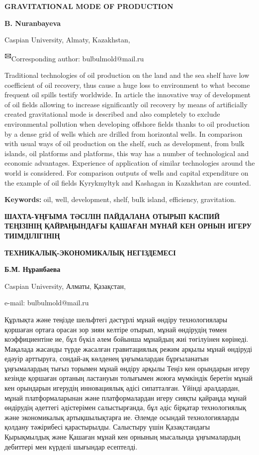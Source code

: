 {\bfseries GRAVITATIONAL MODE OF PRODUCTION}

{\bfseries B. Nuranbayeva}

Caspian University, Almaty, Kazakhstan,

{\bfseries \textsuperscript{🖂}}Corresponding author: bulbulmold@mail.ru

Traditional technologies of oil production on the land and the sea shelf
have low coefficient of oil recovery, thus cause a huge loss to
environment to what become frequent oil spills testify worldwide. In
article the innovative way of development of oil fields allowing to
increase significantly oil recovery by means of artificially created
gravitational mode is described and also completely to exclude
environmental pollution when developing offshore fields thanks to oil
production by a dense grid of wells which are drilled from horizontal
wells. In comparison with usual ways of oil production on the shelf,
such as development, from bulk islands, oil platforms and platforms,
this way has a number of technological and economic advantages.
Experience of application of similar technologies around the world is
considered. For comparison outputs of wells and capital expenditure on
the example of oil fields Kyrykmyltyk and Kashagan in Kazakhstan are
counted.

{\bfseries Keywords:} oil, well, development, shelf, bulk island,
efficiency, gravitation.

{\bfseries ШАХТА-ҰҢҒЫМА ТӘСІЛІН ПАЙДАЛАНА ОТЫРЫП КАСПИЙ ТЕҢІЗІНІҢ
ҚАЙРАҢЫНДАҒЫ ҚАШАҒАН МҰНАЙ КЕН ОРНЫН ИГЕРУ ТИІМДІЛІГІНІҢ}

{\bfseries ТЕХНИКАЛЫҚ-ЭКОНОМИКАЛЫҚ НЕГІЗДЕМЕСІ}

{\bfseries Б.М. Нұранбаева}

Caspian University, Алматы, Қазақстан,

e-mail: bulbulmold@mail.ru

Құрлықта және теңізде шельфтегі дәстүрлі мұнай өндіру технологиялары
қоршаған ортаға орасан зор зиян келтіре отырып, мұнай өндірудің төмен
коэффициентіне ие, бұл бүкіл әлем бойынша мұнайдың жиі төгілуінен
көрінеді. Мақалада жасанды түрде жасалған гравитациялық режим арқылы
мұнай өндіруді едәуір арттыруға, сондай-ақ көлденең ұңғымалардан
бұрғыланатын ұңғымалардың тығыз торымен мұнай өндіру арқылы Теңіз кен
орындарын игеру кезінде қоршаған ортаның ластануын толығымен жоюға
мүмкіндік беретін мұнай кен орындарын игерудің инновациялық әдісі
сипатталған. Үйінді аралдардан, мұнай платформаларынан және
платформалардан игеру сияқты қайраңда мұнай өндірудің әдеттегі
әдістерімен салыстырғанда, бұл әдіс бірқатар технологиялық және
экономикалық артықшылықтарға ие. Әлемде осындай технологияларды қолдану
тәжірибесі қарастырылды. Салыстыру үшін Қазақстандағы Қырықмылдық және
Қашаған мұнай кен орнының мысалында ұңғымалардың дебиттері мен күрделі
шығындар есептелді.

